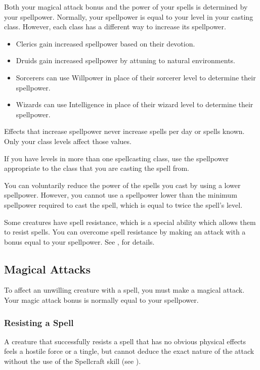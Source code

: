 Both your magical attack bonus and the power of your spells is determined by your spellpower. Normally, your spellpower is equal to your level in your casting class. However, each class has a different way to increase its spellpower.

\begin{itemize}
    \item Clerics gain increased spellpower based on their devotion.
    \item Druids gain increased spellpower by attuning to natural environments.
    \item Sorcerers can use Willpower in place of their sorcerer level to determine their spellpower.
    \item Wizards can use Intelligence in place of their wizard level to determine their spellpower.
\end{itemize}

Effects that increase spellpower never increase spells per day or spells known. Only your class levels affect those values.

 If you have levels in more than one spellcasting class, use the spellpower appropriate to the class that you are casting the spell from.

 You can voluntarily reduce the power of the spells you cast by using a lower spellpower. However, you cannot use a spellpower lower than the minimum spellpower required to cast the spell, which is equal to twice the spell's level.

 Some creatures have spell resistance, which is a special ability which allows them to resist spells. You can overcome spell resistance by making an attack with a bonus equal to your spellpower. See , for details.

\subsection{Magical Attacks}

To affect an unwilling creature with a spell, you must make a magical attack. Your magic attack bonus is normally equal to your spellpower.

\subsubsection{Resisting a Spell} A creature that successfully resists a spell that has no obvious physical effects feels a hostile force or a tingle, but cannot deduce the exact nature of the attack without the use of the Spellcraft skill (see ).

